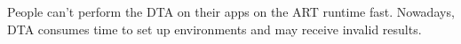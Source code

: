 \documentclass[
    ngerman,american
    ]{scrartcl}
\newcommand{\lang}{en}
\begin{document}
        \begin{description}[style=unboxed]
            \item [\questionOne{\lang}] 
                People can't perform the DTA on their apps on the ART runtime fast. Nowadays, DTA consumes time to set up environments and may receive invalid results.  


\end{description}
\end{document}
